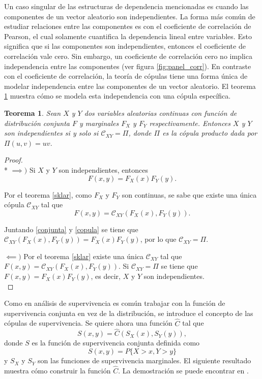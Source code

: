 \documentclass[11pt,a4paper]{article}
\newtheorem{theorem}{Teorema}[section]
\begin{document}
Un caso singular de las estructuras de dependencia mencionadas es cuando las componentes de un vector aleatorio son independientes. La forma más común de estudiar relaciones entre las componentes es con el coeficiente de correlación de Pearson, el cual solamente cuantifica la dependencia lineal entre variables. Esto significa que si las componentes son independientes, entonces el coeficiente de correlación vale cero. Sin embargo, un coeficiente de correlación cero no implica independencia entre las componentes (ver figura \ref{fig:panel_corr}). En contraste con el coeficiente de correlación, la teoría de cópulas tiene una forma única de modelar independencia entre las componentes de un vector aleatorio. El teorema \ref{independencia} muestra cómo se modela esta independencia con una cópula específica.\\

\begin{theorem}
\label{independencia}
Sean $X$ y $Y$ dos variables aleatorias continuas con función de distribución conjunta $F$ y marginales $F_X$ y $F_Y$ respectivamente. Entonces $X$ y $Y$ son independientes si y solo si $\mathcal{C}_{XY} = \Pi$, donde $\Pi$ es la cópula producto dada por $\Pi (u,v) = uv.$
\end{theorem}

\begin{proof}\mbox{}\\*
$\implies\big)$ Si $X$ y $Y$ son independientes, entonces
\begin{equation} \label{conjunta}
F(x, y) = F_X(x)F_Y(y).
\end{equation}

Por el teorema \ref{sklar}, como $F_X$ y $F_Y$ son continuas, se sabe que existe una única cópula $\mathcal{C}_{XY}$ tal que
\begin{equation} \label{copula}
F(x, y) = \mathcal{C}_{XY}(F_X(x), F_Y(y)).
\end{equation}

Juntando \eqref{conjunta} y \eqref{copula} se tiene que $\mathcal{C}_{XY}(F_X(x), F_Y(y)) = F_X(x)F_Y(y)$, por lo que $\mathcal{C}_{XY} = \Pi$.

$\impliedby \big)$ Por el teorema \ref{sklar} existe una única $\mathcal{C}_{XY}$ tal que $F(x, y) = \mathcal{C}_{XY}(F_X(x), F_Y(y))$. Si $\mathcal{C}_{XY} = \Pi$ se tiene que $F(x, y) = F_X(x)F_Y(y)$, es decir, $X$ y $Y$ son independientes.\\
\end{proof}

Como en análisis de supervivencia es común trabajar con la función de supervivencia conjunta en vez de la distribución, se introduce el concepto de las cópulas de supervivencia. Se quiere ahora una función $\widehat{C}$ tal que
\begin{equation} \label{suvcop}
S(x, y) = \widehat{C}(S_X(x), S_Y(y)),
\end{equation}
donde $S$ es la función de supervivencia conjunta definida como $$S(x, y ) = P\lbrace X>x, Y>y\rbrace$$ y $S_X$ y $S_Y$ son las funciones de supervivencia marginales. El siguiente resultado muestra cómo construir la función $\widehat{C}$. La demostración se puede encontrar en \citet{nelsen}.\\
\end{document}
